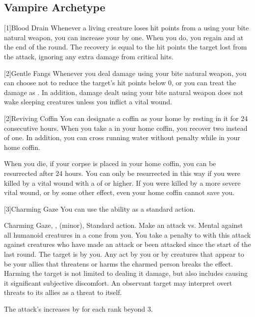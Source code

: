     \subsection{Vampire Archetype}

        [1]{Blood Drain} Whenever a living creature loses hit points from a  using your bite natural weapon, you can increase your  by one.
        When you do, you regain  and  at the end of the round.
        The recovery is equal to the hit points the target lost from the attack, ignoring any extra damage from critical hits.

        [2]{Gentle Fangs} Whenever you deal damage using your bite natural weapon, you can choose not to reduce the target's hit points below 0, or you can treat the damage as .
        In addition, damage dealt using your bite natural weapon does not wake sleeping creatures unless you inflict a vital wound.

        [2]{Reviving Coffin} You can designate a coffin as your home by resting in it for 24 consecutive hours.
        When you take a  in your home coffin, you recover two  instead of one.
        In addition, you can cross running water without penalty while in your home coffin.

        When you die, if your corpse is placed in your home coffin, you can be resurrected after 24 hours.
        You can only be resurrected in this way if you were killed by a vital wound with a  of  or higher.
        If you were killed by a more severe vital wound, or by some other effect, even your home coffin cannot save you.

        [3]{Charming Gaze} You can use the  ability as a standard action.
        \begin{magicalsustainability}{Charming Gaze}{, ,  (minor), }
            \abilityusagetime Standard action.
            \rankline
            Make an attack vs. Mental against all humanoid creatures in a \largearea cone from you.
            You take a  penalty to  with this attack against creatures who have made an attack or been attacked since the start of the last round.
            \hit The target is \charmed by you.
            Any act by you or by creatures that appear to be your allies that threatens or harms the charmed person breaks the effect.
            Harming the target is not limited to dealing it damage, but also includes causing it significant subjective discomfort.
            An observant target may interpret overt threats to its allies as a threat to itself.

            \rankline

            \noindent The attack's  increases by  for each rank beyond 3.
        \end{magicalsustainability}

